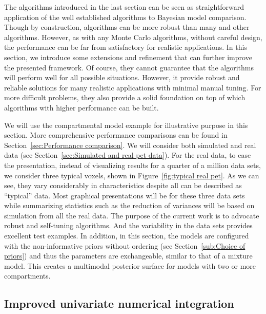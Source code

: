 The algorithms introduced in the last section can be seen as straightforward
application of the well established \smc algorithms to Bayesian model
comparison. Though by construction, \smc algorithms can be more robust than
many \mcmc and other algorithms. However, as with any Monte Carlo algorithms,
without careful design, the performance can be far from satisfactory for
realistic applications. In this section, we introduce some extensions and
refinement that can further improve the presented framework. Of course, they
cannot guarantee that the algorithms will perform well for all possible
situations. However, it provide robust and reliable solutions for many
realistic applications with minimal manual tuning. For more difficult
problems, they also provide a solid foundation on top of which algorithms with
higher performance can be built.

We will use the \pet compartmental model example for illustrative purpose in
this section. More comprehensive performance comparisons can be found in
Section~\ref{sec:Performance comparison}. We will consider both simulated and
real data (see Section~\ref{sec:Simulated and real pet data}). For the real
data, to ease the presentation, instead of visualizing results for a quarter
of a million data sets, we consider three typical voxels, shown in
Figure~\ref{fig:typical real pet}. As we can see, they vary considerably in
characteristics despite all can be described as ``typical'' \pet data. Most
graphical presentations will be for these three data sets while summarizing
statistics such as the reduction of variances will be based on simulation from
all the real data. The purpose of the current work is to advocate robust and
self-tuning algorithms. And the variability in the data sets provides
excellent test examples. In addition, in this section, the models are
configured with the non-informative priors without ordering (see
Section~\ref{sub:Choice of priors}) and thus the parameters are exchangeable,
similar to that of a mixture model. This creates a multimodal posterior
surface for models with two or more compartments.



\subsection{Improved univariate numerical integration}
\label{sub:Improved univariate numerical integration}


